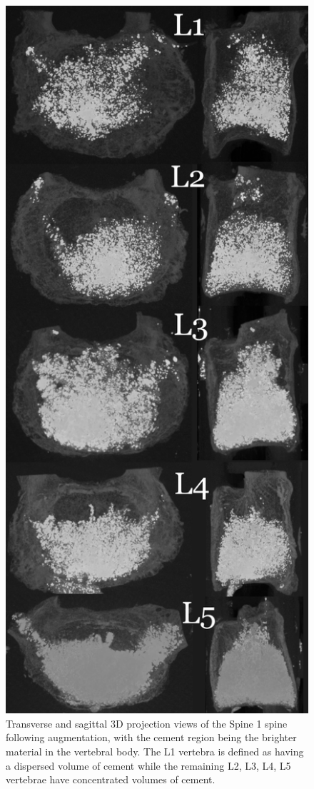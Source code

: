 \begin{figure}[ph!]
  \centering
  \includegraphics[width=.65\textwidth]{Chapters/Chapter_HT_images/G17-11_projections}
	\caption{Transverse and sagittal 3D projection views of the Spine 1 spine following augmentation, with the cement region being the brighter material in the vertebral body. The L1 vertebra is defined as having a dispersed volume of cement while the remaining L2, L3, L4, L5 vertebrae have concentrated volumes of cement.}
  \label{fig:Spine 1_projection}
\end{figure}

